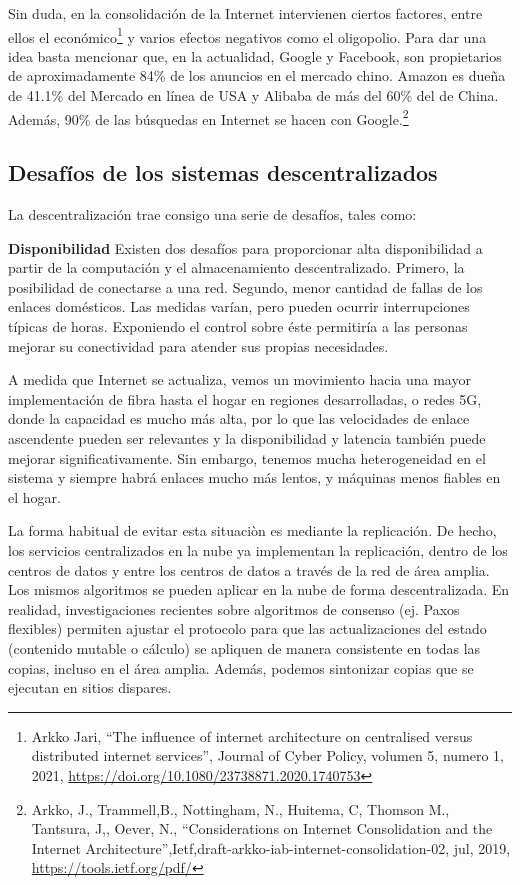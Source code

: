 \documentclass[12pt]{report} %
\begin{document}
\begin{itemize}
Sin duda, en la consolidación de la Internet intervienen ciertos factores, entre ellos el económico\footnote{Arkko Jari, “The influence of internet architecture on centralised versus distributed internet services”, Journal of Cyber Policy, volumen 5, numero 1, 2021, \url{https://doi.org/10.1080/23738871.2020.1740753}} y varios efectos negativos como el oligopolio.  Para dar una idea basta mencionar que, en la actualidad, Google y Facebook, son propietarios de aproximadamente 84\% de los anuncios en el mercado chino. Amazon es dueña de 41.1\% del Mercado en línea de USA y Alibaba de más del 60\% del de China. Además, 90\% de las búsquedas en Internet se hacen con Google.\footnote{Arkko, J., Trammell,B., Nottingham, N., Huitema, C, Thomson M., Tantsura, J,, Oever, N., “Considerations on Internet Consolidation and the Internet Architecture”,Ietf,draft-arkko-iab-internet-consolidation-02, jul, 2019, \url{https://tools.ietf.org/pdf/}} 

\subsection{Desafíos de los sistemas descentralizados}

La descentralización trae consigo una serie de desafíos, tales como:

\textbf{Disponibilidad} Existen dos desafíos para proporcionar alta disponibilidad a partir de la computación y el almacenamiento descentralizado. Primero, la posibilidad de conectarse a una red. Segundo, menor cantidad de fallas de los enlaces domésticos. Las medidas varían, pero pueden ocurrir interrupciones típicas de horas. Exponiendo el control sobre éste permitiría a las personas mejorar su conectividad para atender sus propias necesidades.

A medida que Internet se actualiza, vemos un movimiento hacia una mayor implementación de fibra hasta el hogar en regiones desarrolladas, o redes 5G, donde la capacidad es mucho más alta, por lo que las velocidades de enlace ascendente pueden ser relevantes y la disponibilidad y latencia también puede mejorar significativamente. Sin embargo, tenemos mucha heterogeneidad en el sistema y siempre habrá enlaces mucho más lentos, y máquinas menos fiables en el hogar.

La forma habitual de evitar esta situaciòn es mediante la replicación. De hecho, los servicios centralizados en la nube ya implementan la replicación, dentro de los centros de datos y entre los centros de datos a través de la red de área amplia. Los mismos algoritmos se pueden aplicar en la nube de forma descentralizada. En realidad, investigaciones recientes sobre algoritmos de consenso (ej. Paxos flexibles) permiten ajustar el protocolo para que las actualizaciones del estado (contenido mutable o cálculo) se apliquen de manera consistente en todas las copias, incluso en el área amplia. Además, podemos sintonizar copias que se ejecutan en sitios dispares. 


\end{itemize}
\end{document}
